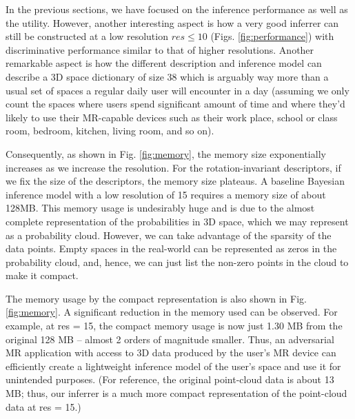 
In the previous sections, we have focused on the inference performance as well as the utility. However, another interesting aspect is how a very good inferrer can still be constructed at a low resolution $res \leq 10$ (Figs. \ref{fig:performance}) with discriminative performance similar to that of higher resolutions. Another remarkable aspect is how the different description and inference model can describe a 3D space dictionary of size 38 which is arguably way more than a usual set of spaces a regular daily user will encounter in a day (assuming we only count the spaces where users spend significant amount of time and where they'd likely to use their MR-capable devices such as their work place, school or class room, bedroom, kitchen, living room, and so on).

Consequently, as shown in Fig. \ref{fig:memory}, the memory size exponentially increases as we increase the resolution. For the rotation-invariant descriptors, if we fix the size of the descriptors, the memory size plateaus.  A baseline Bayesian inference model with a low resolution of 15 requires a memory size of about 128MB. This memory usage is undesirably huge and is due to the almost complete representation of the probabilities in 3D space, which we may represent as a probability cloud. However, we can take advantage of the sparsity of the data points. Empty spaces in the real-world can be represented as zeros in the probability cloud, and, hence, we can just list the non-zero points in the cloud to make it compact.

The memory usage by the compact representation is also shown in Fig. \ref{fig:memory}. A significant reduction in the memory used can be observed. For example, at res = 15, the compact memory usage is now just 1.30 MB from the original 128 MB -- almost 2 orders of magnitude smaller. Thus, an adversarial MR application with access to 3D data produced by the user's MR device can efficiently create a lightweight inference model of the user's space and use it for unintended purposes. (For reference, the original point-cloud data is about 13 MB; thus, our inferrer is a much more compact representation of the point-cloud data at res = 15.)

